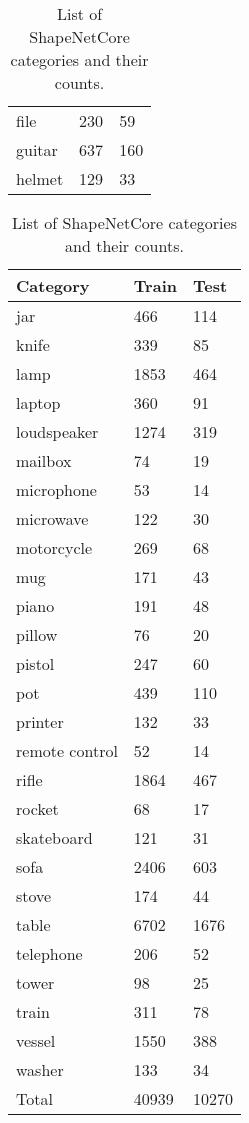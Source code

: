 \begin{table}[]
\begin{tabular}[t]{lll}
		file               & 230            & 59            \\
		guitar             & 637            & 160           \\
		helmet             & 129            & 33
	\end{tabular}
	\begin{tabular}[t]{lll}
		\hline
		\textbf{Category} & \textbf{Train} & \textbf{Test} \\ \hline
		jar               & 466            & 114           \\
		knife             & 339            & 85            \\
		lamp              & 1853           & 464           \\
		laptop            & 360            & 91            \\
		loudspeaker       & 1274           & 319           \\
		mailbox           & 74             & 19            \\
		microphone        & 53             & 14            \\
		microwave         & 122            & 30            \\
		motorcycle        & 269            & 68            \\
		mug               & 171            & 43            \\
		piano             & 191            & 48            \\
		pillow            & 76             & 20            \\
		pistol            & 247            & 60            \\
		pot               & 439            & 110           \\
		printer           & 132            & 33            \\
		remote control    & 52             & 14            \\
		rifle             & 1864           & 467           \\
		rocket            & 68             & 17            \\
		skateboard        & 121            & 31            \\
		sofa              & 2406           & 603           \\
		stove             & 174            & 44            \\
		table             & 6702           & 1676          \\
		telephone         & 206            & 52            \\
		tower             & 98             & 25            \\
		train             & 311            & 78            \\
		vessel            & 1550           & 388           \\
		washer            & 133            & 34            \\
		Total             & 40939          & 10270
	\end{tabular}
	
	
	\caption{List of ShapeNetCore categories and their counts.}
	\label{Table:shapenetcats}
\end{table}